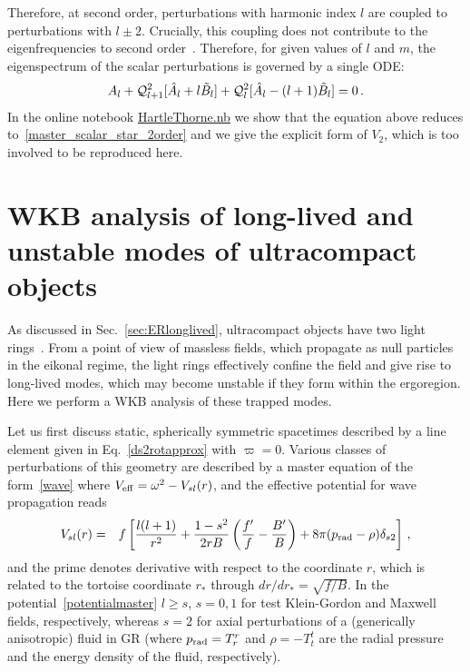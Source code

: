 \documentclass[11pt]{article}
\numberwithin{equation}{section} %
\begin{document}
Therefore, at second order,
perturbations with harmonic index $l$ are coupled to perturbations
with $l\pm2$. Crucially, this coupling does not
contribute to the eigenfrequencies to second order~\cite{Pani:2012bp,Pani:2013pma}. 
Therefore, for given values of $l$ and $m$, the eigenspectrum of the scalar perturbations is governed by a single ODE:
\begin{equation}
A_l+{\cal Q}_{l+1}^2[\hat{A}_l+l\tilde{B}_l]+{\cal Q}_{l}^2[\hat{A}_l-(l+1)\tilde{B}_l]=0\,.\label{eqSCAL2}
\end{equation}
In the online notebook \url{HartleThorne.nb} we show that the equation above reduces to~\eqref{master_scalar_star_2order} and we give the explicit form of $V_2$, which is too involved to be reproduced here.

\section{WKB analysis of long-lived and unstable modes of ultracompact objects} \label{app:WKB}
As discussed in Sec.~\ref{sec:ERlonglived}, ultracompact objects have two light rings~\cite{Cardoso:2014sna}. From a point of view of massless
fields, which propagate as null particles in the eikonal regime, the light rings effectively confine
the field and give rise to long-lived modes, which may become unstable if they form within the ergoregion. Here we perform a WKB analysis of these trapped modes.

Let us first discuss static, spherically symmetric spacetimes described by a line element given in Eq.~\eqref{ds2rotapprox} with $\varpi=0$.
Various classes of perturbations of this geometry are described by a master equation of the form~\eqref{wave} where $V_{\rm eff}=\omega^2-V_{sl}(r)$, and the effective potential for wave propagation reads~\cite{Cardoso:2014sna}
%
\begin{eqnarray}
V_{sl}(r)&=&f\left[\frac{l(l+1)}{r^2}+\frac{1-s^2}{2r B}\left(\frac{f'}{f}-\frac{B'}{B}\right)+8\pi(p_{\rm rad}-\rho) \delta_{s2}\right]\,,\label{potentialmaster}
\end{eqnarray}
%
and the prime denotes derivative with respect to the coordinate $r$, which is related to the tortoise coordinate $r_*$ through $dr/dr_*=\sqrt{f/B}$. In the potential~\eqref{potentialmaster} $l\geq s$, $s=0,1$ for test Klein-Gordon and Maxwell fields, respectively, whereas $s=2$ for axial perturbations of a (generically anisotropic) fluid in GR (where $p_{\rm rad}=T_r^r$ and $\rho=-T_t^t$ are the radial pressure and the energy density of the fluid, respectively).
\end{document}
